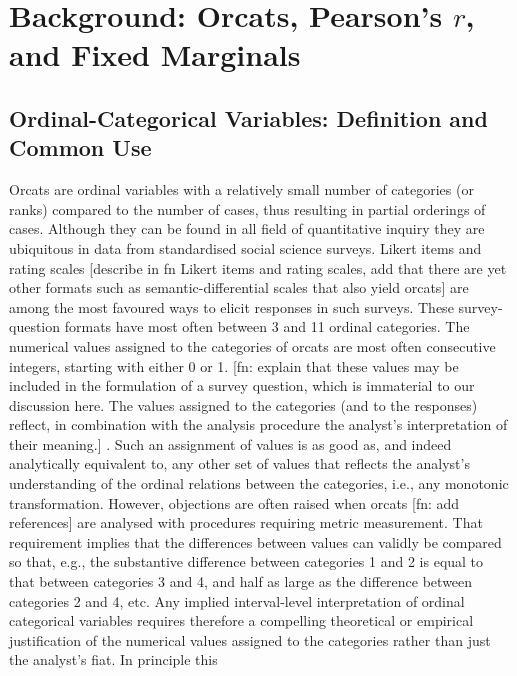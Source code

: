 \documentclass[
  12pt,
]{article}
\theoremstyle{plain}
\theoremstyle{definition}
\theoremstyle{remark}
\begin{document}
\section{\texorpdfstring{Background: Orcats, Pearson's \(r\), and Fixed
Marginals}{Background: Orcats, Pearson's r, and Fixed Marginals}}\label{sec-background}

\subsection{Ordinal-Categorical Variables: Definition and Common
Use}\label{ordinal-categorical-variables-definition-and-common-use}

Orcats are ordinal variables with a relatively small number of
categories (or ranks) compared to the number of cases, thus resulting in
partial orderings of cases. Although they can be found in all field of
quantitative inquiry they are ubiquitous in data from standardised
social science surveys. Likert items and rating scales {[}describe in fn
Likert items and rating scales, add that there are yet other formats
such as semantic-differential scales that also yield orcats{]} are among
the most favoured ways to elicit responses in such surveys. These
survey-question formats have most often between 3 and 11 ordinal
categories. The numerical values assigned to the categories of orcats
are most often consecutive integers, starting with either 0 or 1. {[}fn:
explain that these values may be included in the formulation of a survey
question, which is immaterial to our discussion here. The values
assigned to the categories (and to the responses) reflect, in
combination with the analysis procedure the analyst's interpretation of
their meaning.{]} . Such an assignment of values is as good as, and
indeed analytically equivalent to, any other set of values that reflects
the analyst's understanding of the ordinal relations between the
categories, i.e., any monotonic transformation. However, objections are
often raised when orcats {[}fn: add references{]} are analysed with
procedures requiring metric measurement. That requirement implies that
the differences between values can validly be compared so that, e.g.,
the substantive difference between categories 1 and 2 is equal to that
between categories 3 and 4, and half as large as the difference between
categories 2 and 4, etc. Any implied interval-level interpretation of
ordinal categorical variables requires therefore a compelling
theoretical or empirical justification of the numerical values assigned
to the categories rather than just the analyst's fiat. In principle this
\end{document}
